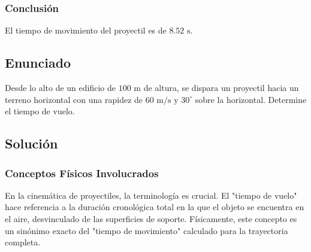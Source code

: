 \documentclass[12pt, a4paper]{article}
\begin{document}
\subsubsection*{Conclusión}

El tiempo de movimiento del proyectil es de $8.52 \text{ s}$.

\newpage

\subsection*{Enunciado}

Desde lo alto de un edificio de $100 \text{ m}$ de altura, se dispara un proyectil hacia un terreno horizontal con una rapidez de $60 \text{ m/s}$ y $30^\circ$ sobre la horizontal. Determine el tiempo de vuelo.

\vspace{0.5cm}

\begin{center}
\end{center}

\subsection*{Solución}

\subsubsection*{Conceptos Físicos Involucrados}

En la cinemática de proyectiles, la terminología es crucial. El "tiempo de vuelo" hace referencia a la duración cronológica total en la que el objeto se encuentra en el aire, desvinculado de las superficies de soporte. Físicamente, este concepto es un sinónimo exacto del "tiempo de movimiento" calculado para la trayectoria completa.
\end{document}
